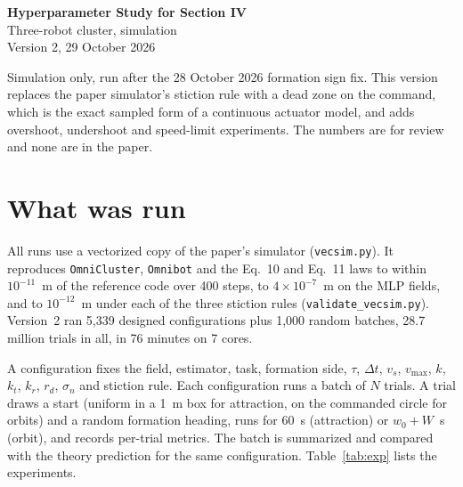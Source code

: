 \documentclass[10pt,letterpaper]{article}
\newcommand{\vmax}{v_{\max}}
\newcommand{\dt}{\Delta t}
\begin{document}
\begin{center}
{\LARGE\sffamily\bfseries Hyperparameter Study for Section IV}\\[4pt]
{\large\sffamily Three-robot cluster, simulation}\\[4pt]
Version 2, 29 October 2026
\end{center}

\begin{center}
\begin{minipage}{0.86\textwidth}
\small Simulation only, run after the 28 October 2026 formation sign fix. This version replaces the paper simulator's stiction rule with a dead zone on the command, which is the exact sampled form of a continuous actuator model, and adds overshoot, undershoot and speed-limit experiments. The numbers are for review and none are in the paper.
\end{minipage}
\end{center}

\section*{What was run}

All runs use a vectorized copy of the paper's simulator (\texttt{vecsim.py}). It reproduces \texttt{OmniCluster}, \texttt{Omnibot} and the Eq.~10 and Eq.~11 laws to within $10^{-11}$~m of the reference code over 400 steps, to $4\times10^{-7}$~m on the MLP fields, and to $10^{-12}$~m under each of the three stiction rules (\texttt{validate\_vecsim.py}). Version~2 ran 5,339 designed configurations plus 1,000 random batches, 28.7 million trials in all, in 76 minutes on 7 cores.

A configuration fixes the field, estimator, task, formation side, $\tau$, $\dt$, $v_s$, $\vmax$, $k$, $k_t$, $k_r$, $r_d$, $\sigma_n$ and stiction rule. Each configuration runs a batch of $N$ trials. A trial draws a start (uniform in a 1~m box for attraction, on the commanded circle for orbits) and a random formation heading, runs for 60~s (attraction) or $w_0 + W$~s (orbit), and records per-trial metrics. The batch is summarized and compared with the theory prediction for the same configuration. Table~\ref{tab:exp} lists the experiments.
\end{document}
